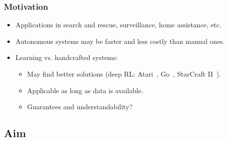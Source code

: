 \begin{frame}
    \frametitle{Motivation}
    
    \begin{itemize}
        \item Applications in search and rescue, surveillance, home assistance, etc.
        \item Autonomous systems may be faster and less costly than manual ones.
        \item Learning vs. handcrafted systems:
        \begin{itemize}
            \item May find better solutions (deep RL: Atari~\cite{mnih_human-level_2015}, Go~\cite{silver_mastering_2016}, StarCraft II~\cite{vinyals_grandmaster_2019}).
            \item Applicable as long as data is available.
            \item Guarantees and understandability?
        \end{itemize}
    \end{itemize}
\end{frame}

\subsection{Aim}

